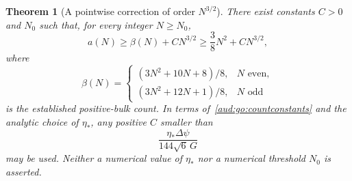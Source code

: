 \documentclass[11pt,a4paper]{article}
\numberwithin{equation}{section}
\newtheorem{theorem}{Theorem}[section]
\begin{document}
\begin{theorem}[A pointwise correction of order $N^{3/2}$]\label{aud:go:pointwisecount}
There exist constants $C>0$ and $N_0$ such that, for every integer $N\ge N_0$,
\begin{equation}\label{aud:go:maincount}
 a(N)\ge\beta(N)+CN^{3/2}\ge\frac38N^2+CN^{3/2},
\end{equation}
where
\[
 \beta(N)=\begin{cases}
 (3N^2+10N+8)/8,&N\text{ even},\\
 (3N^2+12N+1)/8,&N\text{ odd}
 \end{cases}
\]
is the established positive-bulk count. In terms of~\eqref{aud:go:countconstants} and the analytic choice of $\eta_*$, any positive $C$ smaller than
\begin{equation}\label{aud:go:Cexpression}
 \frac{\eta_*\Delta\psi}{144\sqrt6\,G}
\end{equation}
may be used. Neither a numerical value of $\eta_*$ nor a numerical threshold $N_0$ is asserted.
\end{theorem}
\end{document}

